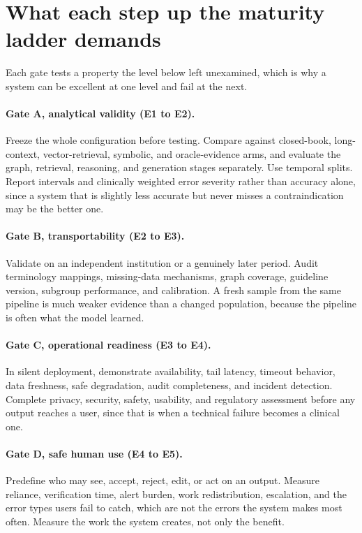 \documentclass[10pt,a4paper]{article}
\begin{document}
\section{What each step up the maturity ladder demands}
\label{s:gates}

Each gate tests a property the level below left unexamined, which is why a system can be excellent at
one level and fail at the next.

\paragraph{Gate A, analytical validity (E1 to E2).}
Freeze the whole configuration before testing. Compare against closed-book, long-context,
vector-retrieval, symbolic, and oracle-evidence arms, and evaluate the graph, retrieval, reasoning,
and generation stages separately. Use temporal splits. Report intervals and clinically weighted error
severity rather than accuracy alone, since a system that is slightly less accurate but never misses a
contraindication may be the better one.

\paragraph{Gate B, transportability (E2 to E3).}
Validate on an independent institution or a genuinely later period. Audit terminology mappings,
missing-data mechanisms, graph coverage, guideline version, subgroup performance, and calibration. A
fresh sample from the same pipeline is much weaker evidence than a changed population, because the
pipeline is often what the model learned.

\paragraph{Gate C, operational readiness (E3 to E4).}
In silent deployment, demonstrate availability, tail latency, timeout behavior, data freshness, safe
degradation, audit completeness, and incident detection. Complete privacy, security, safety, usability,
and regulatory assessment before any output reaches a user, since that is when a technical failure
becomes a clinical one.

\paragraph{Gate D, safe human use (E4 to E5).}
Predefine who may see, accept, reject, edit, or act on an output. Measure reliance, verification time,
alert burden, work redistribution, escalation, and the error types users fail to catch, which are not
the errors the system makes most often. Measure the work the system creates, not only the benefit.
\end{document}
